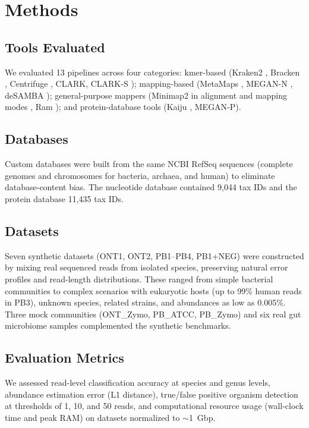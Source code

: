 \documentclass[11pt]{article}
\begin{document}
\section{Methods}

\subsection{Tools Evaluated}

We evaluated 13 pipelines across four categories: kmer-based (Kraken2 \citep{wood2019improved}, Bracken \citep{lu2017bracken}, Centrifuge \citep{kim2016centrifuge}, CLARK, CLARK-S \citep{ounit2015clark}); mapping-based (MetaMaps \citep{dilthey2019metamaps}, MEGAN-N \citep{huson2018megan}, deSAMBA \citep{vural2021desamba}); general-purpose mappers (Minimap2 in alignment and mapping modes \citep{li2018minimap2}, Ram \citep{skoufos2022ram}); and protein-database tools (Kaiju \citep{menzel2016kaiju}, MEGAN-P).

\subsection{Databases}

Custom databases were built from the same NCBI RefSeq sequences (complete genomes and chromosomes for bacteria, archaea, and human) to eliminate database-content bias. The nucleotide database contained 9,044 tax IDs and the protein database 11,435 tax IDs.

\subsection{Datasets}

Seven synthetic datasets (ONT1, ONT2, PB1--PB4, PB1+NEG) were constructed by mixing real sequenced reads from isolated species, preserving natural error profiles and read-length distributions. These ranged from simple bacterial communities to complex scenarios with eukaryotic hosts (up to 99\% human reads in PB3), unknown species, related strains, and abundances as low as 0.005\%. Three mock communities (ONT\_Zymo, PB\_ATCC, PB\_Zymo) and six real gut microbiome samples complemented the synthetic benchmarks.

\subsection{Evaluation Metrics}

We assessed read-level classification accuracy at species and genus levels, abundance estimation error (L1 distance), true/false positive organism detection at thresholds of 1, 10, and 50 reads, and computational resource usage (wall-clock time and peak RAM) on datasets normalized to $\sim$1~Gbp.
\end{document}

